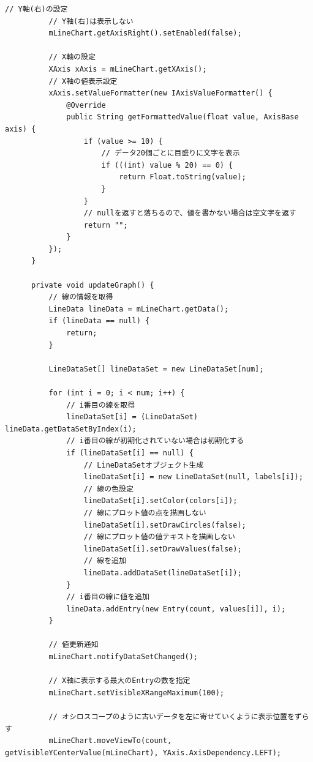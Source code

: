 \documentclass[dvipdfmx,autodetect-engine,titlepage]{jsarticle}
\begin{document}
\begin{lstlisting}[caption=MainActivity.jave,label=java]
          // Y軸(右)の設定
          // Y軸(右)は表示しない
          mLineChart.getAxisRight().setEnabled(false);
  
          // X軸の設定
          XAxis xAxis = mLineChart.getXAxis();
          // X軸の値表示設定
          xAxis.setValueFormatter(new IAxisValueFormatter() {
              @Override
              public String getFormattedValue(float value, AxisBase axis) {
                  if (value >= 10) {
                      // データ20個ごとに目盛りに文字を表示
                      if (((int) value % 20) == 0) {
                          return Float.toString(value);
                      }
                  }
                  // nullを返すと落ちるので、値を書かない場合は空文字を返す
                  return "";
              }
          });
      }
  
      private void updateGraph() {
          // 線の情報を取得
          LineData lineData = mLineChart.getData();
          if (lineData == null) {
              return;
          }
  
          LineDataSet[] lineDataSet = new LineDataSet[num];
  
          for (int i = 0; i < num; i++) {
              // i番目の線を取得
              lineDataSet[i] = (LineDataSet) lineData.getDataSetByIndex(i);
              // i番目の線が初期化されていない場合は初期化する
              if (lineDataSet[i] == null) {
                  // LineDataSetオブジェクト生成
                  lineDataSet[i] = new LineDataSet(null, labels[i]);
                  // 線の色設定
                  lineDataSet[i].setColor(colors[i]);
                  // 線にプロット値の点を描画しない
                  lineDataSet[i].setDrawCircles(false);
                  // 線にプロット値の値テキストを描画しない
                  lineDataSet[i].setDrawValues(false);
                  // 線を追加
                  lineData.addDataSet(lineDataSet[i]);
              }
              // i番目の線に値を追加
              lineData.addEntry(new Entry(count, values[i]), i);
          }
  
          // 値更新通知
          mLineChart.notifyDataSetChanged();
  
          // X軸に表示する最大のEntryの数を指定
          mLineChart.setVisibleXRangeMaximum(100);
  
          // オシロスコープのように古いデータを左に寄せていくように表示位置をずらす
          mLineChart.moveViewTo(count, getVisibleYCenterValue(mLineChart), YAxis.AxisDependency.LEFT);
  

\end{lstlisting}
\end{document}
